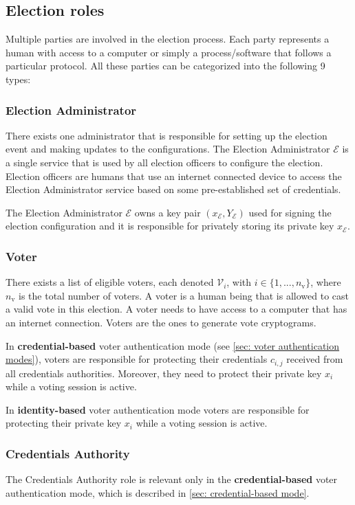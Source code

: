 \subsection{Election roles} \label{sec: election roles}
Multiple parties are involved in the election process. Each party represents a human with access to a computer or simply a process/software that follows a particular protocol. All these parties can be categorized into the following 9 types: 


\subsubsection{Election Administrator}
There exists one administrator that is responsible for setting up the election event and making updates to the configurations. The Election Administrator $\mathcal{E}$ is a single service that is used by all election officers to configure the election. Election officers are humans that use an internet connected device to access the Election Administrator service based on some pre-established set of credentials.

The Election Administrator $\mathcal{E}$ owns a key pair $(x_\mathcal{E}, Y_\mathcal{E})$ used for signing the election configuration and it is responsible for privately storing its private key $x_\mathcal{E}$.


\subsubsection{Voter}
There exists a list of eligible voters, each denoted $\mathcal{V}_i$, with $i \in \{ 1, ..., n_\mathrm{v} \}$, where $n_\mathrm{v}$ is the total number of voters.  A voter is a human being that is allowed to cast a valid vote in this election. A voter needs to have access to a computer that has an internet connection. Voters are the ones to generate vote cryptograms.

In \textbf{credential-based} voter authentication mode (see \cref{sec: voter authentication modes}), voters are responsible for protecting their credentials $c_{i,j}$ received from all credentials authorities. Moreover, they need to protect their private key $x_i$ while a voting session is active.

In \textbf{identity-based} voter authentication mode voters are responsible for protecting their private key $x_i$ while a voting session is active.


\subsubsection{Credentials Authority}
The Credentials Authority role is relevant only in the \textbf{credential-based} voter authentication mode, which is described in \cref{sec: credential-based mode}.
    
